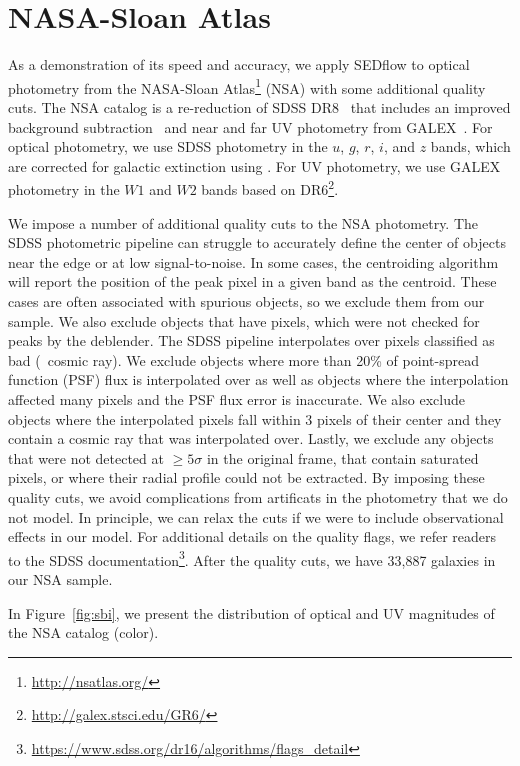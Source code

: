 \section{NASA-Sloan Atlas} \label{sec:obs}
As a demonstration of its speed and accuracy, we apply {\sc SEDflow} to optical
photometry from the NASA-Sloan Atlas\footnote{\url{http://nsatlas.org/}} (NSA)
with some additional quality cuts.
The NSA catalog is a re-reduction of SDSS DR8~\citep{aihara2011} that includes
an improved background subtraction~\citep{blanton2011} and near and far UV
photometry from GALEX~\citep{}.
For optical photometry, we use SDSS photometry in the $u$, $g$, $r$, $i$, and
$z$ bands, which are corrected for galactic extinction using
\cite{schlegel1997}.
For UV photometry, we use GALEX photometry in the $W1$ and $W2$ bands based on
DR6\footnote{\url{http://galex.stsci.edu/GR6/}}.

We impose a number of additional quality cuts to the NSA photometry.
The SDSS photometric pipeline can struggle to accurately define the center
of objects near the edge or at low signal-to-noise. 
In some cases, the centroiding algorithm will report the position of the peak
pixel in a given band as the centroid. 
These cases are often associated with spurious objects, so we exclude them
from our sample. 
We also exclude objects that have pixels, which were not checked for peaks
by the deblender. %
The SDSS pipeline interpolates over pixels classified as bad (\eg~cosmic ray).
We exclude objects where more than 20\% of point-spread function (PSF) flux is
interpolated over as well as objects where the interpolation affected many
pixels and the PSF flux error is inaccurate. 
We also exclude objects where the interpolated pixels fall within 3 pixels of
their center and they contain a cosmic ray that was interpolated over.
Lastly, we exclude any objects that were not detected at $\ge5\sigma$ in the
original frame, that contain saturated pixels, or where their radial profile 
could not be extracted.
By imposing these quality cuts, we avoid complications from artificats in the
photometry that we do not model. 
In principle, we can relax the cuts if we were to include observational effects
in our model.
For additional details on the quality flags, we refer readers to the SDSS
documentation\footnote{\url{https://www.sdss.org/dr16/algorithms/flags_detail}}.
After the quality cuts, we have 33,887 galaxies in our NSA sample.

In Figure~\ref{fig:sbi}, we present the distribution of optical and UV
magnitudes of the NSA catalog (color). 



